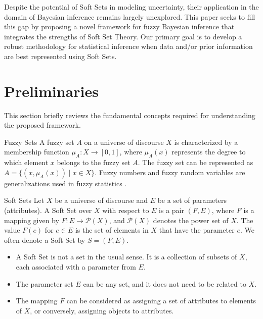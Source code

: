\documentclass[twoside]{article}
\begin{document}
Despite the potential of Soft Sets in modeling uncertainty, their application in the domain of Bayesian inference remains largely unexplored. This paper seeks to fill this gap by proposing a novel framework for fuzzy Bayesian inference that integrates the strengths of Soft Set Theory. Our primary goal is to develop a robust methodology for statistical inference when data and/or prior information are best represented using Soft Sets.

\section{Preliminaries} \label{sec:preliminaries}

This section briefly reviews the fundamental concepts required for understanding the proposed framework.

\begin{dfn}{Fuzzy Sets} \label{subsec:fuzzy_sets}
A fuzzy set $A$ on a universe of discourse $X$ is characterized by a membership function $\mu_A: X \to [0, 1]$, where $\mu_A(x)$ represents the degree to which element $x$ belongs to the fuzzy set $A$. The fuzzy set can be represented as $A = \{ (x, \mu_A(x)) \mid x \in X \}$. Fuzzy numbers and fuzzy random variables are generalizations used in fuzzy statistics \cite{kaufmann:1987}.
\end{dfn}

\begin{dfn}{Soft Sets}\label{subsec:soft_sets}
Let $X$ be a universe of discourse and $E$ be a set of parameters (attributes). A Soft Set over $X$ with respect to $E$ is a pair $(F, E)$, where $F$ is a mapping given by $F: E \to \mathcal{P}(X)$, and $\mathcal{P}(X)$ denotes the power set of $X$. The value $F(e)$ for $e \in E$ is the set of elements in $X$ that have the parameter $e$. We often denote a Soft Set by $S = (F, E)$.
\end{dfn}

\begin{rem}
\begin{itemize}
    \item A Soft Set is not a set in the usual sense. It is a collection of subsets of $X$, each associated with a parameter from $E$.
    \item The parameter set $E$ can be any set, and it does not need to be related to $X$.
    \item The mapping $F$ can be considered as assigning a set of attributes to elements of $X$, or conversely, assigning objects to attributes.
\end{itemize}
\end{rem}
\end{document}
